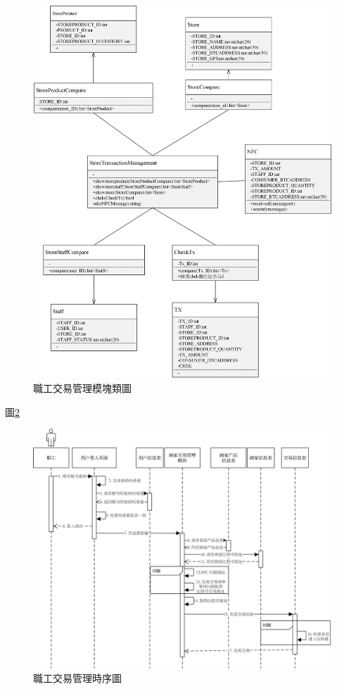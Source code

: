 	\begin{figure}[htbp]
		\centering
		\includegraphics[width = 1\textwidth]{c5.jpg}
		\caption{職工交易管理模塊類圖}\label{c5}
	\end{figure}

圖\ref{time4}

	\begin{figure}[htbp]
		\centering
		\includegraphics[width = 1\textwidth]{time4.jpg}
		\caption{職工交易管理時序圖}\label{time4}
	\end{figure}

